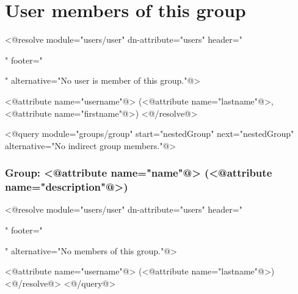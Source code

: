 \section*{User members of this group}

<@resolve module="users/user" dn-attribute="users" header="\begin{itemize}" footer="\end{itemize}" alternative="No user is member of this group."@>
  \item <@attribute name="username"@> (<@attribute name="lastname"@>, <@attribute name="firstname"@>)
<@/resolve@>

<@query module="groups/group" start="nestedGroup" next="nestedGroup" alternative="No indirect group members."@>
  \subsubsection*{Group: <@attribute name="name"@> (<@attribute name="description"@>)}
  <@resolve module="users/user" dn-attribute="users" header="\begin{itemize}" footer="\end{itemize}" alternative="No members of this group."@>
    \item <@attribute name="username"@> (<@attribute name="lastname"@>)
  <@/resolve@>
<@/query@>

\newpage
